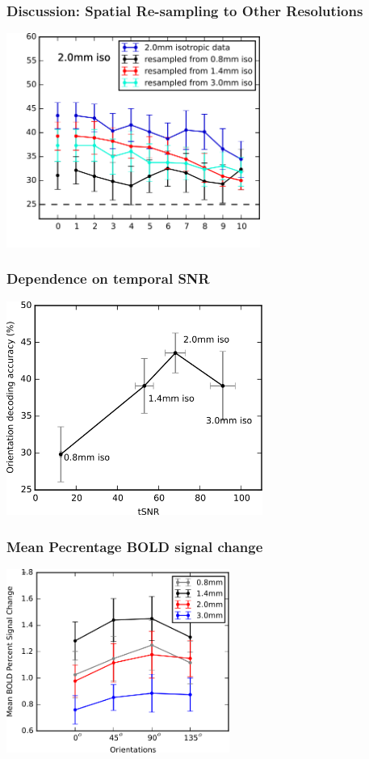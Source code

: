 \documentclass{beamer}
\begin{document}
  \begin{frame}
    \frametitle{Discussion: Spatial Re-sampling to Other Resolutions}
        \begin{center}
            \includegraphics[height=7cm]{../pictures/resampling}
        \end{center}
    \end{frame}
    
    
  \begin{frame}
    \frametitle{Dependence on temporal SNR}
        \begin{center}
            \includegraphics[height=7cm]{../pictures/tSNR_vs_accuracy}
        \end{center}
    \end{frame}    

  \begin{frame}
    \frametitle{Mean Pecrentage BOLD signal change}
        \begin{center}
            \includegraphics[height=6cm]{../pictures/signal_change}
        \end{center}
    \end{frame} 
\end{document}
